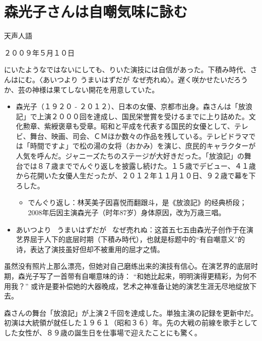 \documentclass{ctexart}
\newcommand{\bbigbreak}{\bigbreak \bigbreak}
\begin{document}
\section*{\gothic 森光子さんは自嘲気味に詠む}

\begin{center}
    \mincho
    天声人語

    ２００９年５月１０日
\end{center}


\mincho
{}にいたようなではないにしても、りいた演技には自信があった。下積み時代、さんはにむ。〈あいつより うまいはずだが なぜ売れぬ〉。遅く咲かせたいだろうか、芸の神様は果てしない開花を用意していた。

\begin{itemize}
    \mincho
    \item 森光子（１９２０ - ２０１２）、日本の女優、京都市出身。森さんは「放浪記」で上演２０００回を達成し、国民栄誉賞を受けるまでに上り詰めた。文化勲章、紫綬褒章も受章。昭和と平成を代表する国民的女優として、テレビ、舞台、映画、司会、ＣＭほか数々の作品を残している。テレビドラマでは「時間ですよ」で松の湯の女将（おかみ）を演じ、庶民的キャラクターが人気を呼んだ。ジャニーズたちのステージが大好きだった。「放浪記」の舞台では８７歳まででんぐり返しを披露し続けた。１５歳でデビュー、４１歳から花開いた女優人生だったが、２０１２年１１月１０日、９２歳で幕を下ろした。
    \rmfamily
    \begin{itemize}
        \item \mincho でんぐり返し：\rmfamily 林芙美子因喜悦而翻跟斗，是《放浪記》的经典桥段；2008年后因主演森光子（时年87岁）身体原因，改为万歳三唱。
    \end{itemize}
    \item \mincho あいつより \ うまいはずだが \ なぜ売れぬ：\rmfamily 这首五七五由森光子创作于在演艺界屈于人下的底层时期（下積み時代），也就是标题中的“有自嘲意义”的诗，表达了演技虽好但却不被重用的屈才之情。
\end{itemize}

\rmfamily
虽然没有照片上那么漂亮，但她对自己磨练出来的演技有信心。在演艺界的底层时期，森光子写了一首带有自嘲意味的诗： “和她比起来，明明演得更精彩，为何不用我？” 或许是要补偿她的大器晚成，艺术之神准备让她的演艺生涯无尽地绽放下去。

\bbigbreak

\mincho
森さんの舞台「放浪記」が上演２千回を達成した。単独主演の記録を更新中だ。初演は大統領が就任した１９６１（昭和３６）年。先の大戦の前線を歌手としてした女性が、８９歳の誕生日を仕事場で迎えたことにも驚く。
\end{document}

